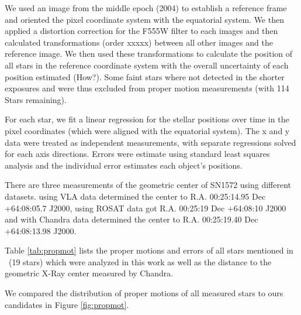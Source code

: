 We used an image from the middle epoch (2004) to establish a reference frame and oriented the pixel coordinate system with the equatorial system. We then applied a distortion correction for the F555W filter \citep{2006acs..rept....1A} to each images and then calculated transformations (order xxxxx) between all other images and the reference image. We then used these transformations to calculate the position of all stars in the reference coordinate system  with the overall uncertainty of each position estimated (How?).
Some faint stars where not detected in the shorter exposures and were thus excluded from proper motion measurements (with 114 Stars remaining).

For each star, we fit a linear regression for the stellar positions over time in the pixel coordinates (which were aligned with the equatorial system). The x and y data were treated as independent measurements, with separate regressions solved for each axis directions. Errors were estimate using standard least squares analysis and the individual error estimates each object's positions.

There are three measurements of the geometric center of SN1572 using different datasets. \cite{1997ApJ...491..816R} using VLA data determined the center to R.A. 00:25:14.95 Dec +64:08:05.7 J2000,  \citet{2000ApJ...545L..53H} using ROSAT data got R.A. 00:25:19 Dec +64:08:10 J2000 and \cite{2005ApJ...634..376W} with Chandra data determined the center to R.A. 00:25:19.40 Dec +64:08:13.98 J2000. 

 Table \ref{tab:propmot} lists the proper motions and errors of all stars mentioned in \rl\ (19 stars) which were analyzed in this work as well as the distance to the geometric X-Ray center measured by Chandra.

We compared the distribution of proper motions of all measured stars to ours candidates in Figure \ref{fig:propmot}.

